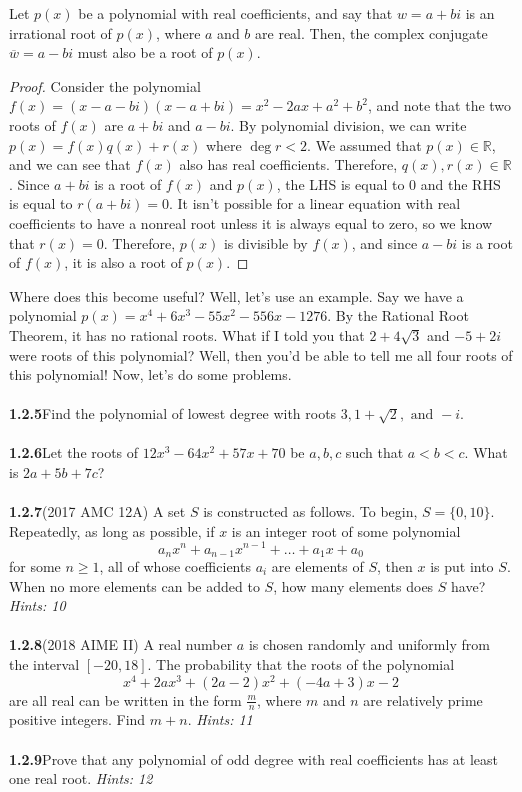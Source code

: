 \documentclass[12pt]{article}
\begin{document}
\begin{tcolorbox}[breakable, colback=blue!10!white, colframe=blue!50!black, title= Irrational Roots of Polynomials in $\mathbb{Q}$: Complex Conjugate Roots Theorem]
    Let $p(x)$ be a polynomial with real coefficients, and say that $w=a+bi$ is an irrational root of $p(x)$, where $a$ and $b$ are real. Then, the complex conjugate $\overline{w}=a-bi$ must also be a root of $p(x)$. 
    \begin{proof}
        Consider the polynomial $f(x)=(x-a-bi)(x-a+bi)=x^2-2ax+a^2+b^2$, and note that the two roots of $f(x)$ are $a+bi$ and $a-bi$. By polynomial division, we can write $p(x)=f(x)q(x)+r(x)$ where $\deg r<2$. We assumed that $p(x)\in\mathbb{R}$, and we can see that $f(x)$ also has real coefficients. Therefore, $q(x),r(x)\in\mathbb{R}$. Since $a+bi$ is a root of $f(x)$ and $p(x)$, the LHS is equal to $0$ and the RHS is equal to $r(a+bi)=0$. It isn't possible for a linear equation with real coefficients to have a nonreal root unless it is always equal to zero, so we know that $r(x)=0$. Therefore, $p(x)$ is divisible by $f(x)$, and since $a-bi$ is a root of $f(x)$, it is also a root of $p(x)$.
    \end{proof}
\end{tcolorbox}
Where does this become useful? Well, let's use an example. Say we have a polynomial $p(x)=x^4+6x^3-55x^2-556x-1276$. By the Rational Root Theorem, it has no rational roots. What if I told you that $2+4\sqrt{3}$ and $-5+2i$ were roots of this polynomial? Well, then you'd be able to tell me all four roots of this polynomial! Now, let's do some problems.\\\\
\textbf{1.2.5}\quad Find the polynomial of lowest degree with roots $3, 1+\sqrt{2},\text{ and } -i$.\\\\ 
\textbf{1.2.6}\quad Let the roots of $12x^3-64x^2+57x+70$ be $a,b,c$ such that $a<b<c$. What is $2a+5b+7c$?\\\\
\textbf{1.2.7}\quad (2017 AMC 12A) A set $S$ is constructed as follows. To begin, $S = \{0,10\}$. Repeatedly, as long as possible, if $x$ is an integer root of some polynomial \[a_{n}x^n + a_{n-1}x^{n-1} + \dots + a_{1}x + a_0\] for some $n\geq{1}$, all of whose coefficients $a_i$ are elements of $S$, then $x$ is put into $S$. When no more elements can be added to $S$, how many elements does $S$ have? \textit{Hints: 10}\\\\
\textbf{1.2.8}\quad (2018 AIME II) A real number $a$ is chosen randomly and uniformly from the interval $[-20, 18]$. The probability that the roots of the polynomial \[x^4 + 2ax^3 + (2a - 2)x^2 + (-4a + 3)x - 2\]
are all real can be written in the form $\frac{m}{n}$, where $m$ and $n$ are relatively prime positive integers. Find $m + n$. \textit{Hints: 11}\\\\ 
\textbf{1.2.9}\quad Prove that any polynomial of odd degree with real coefficients has at least one real root. \textit{Hints: 12}
\end{document}
